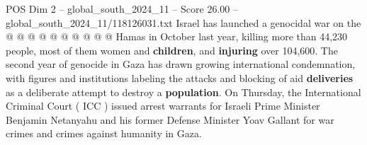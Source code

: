 \begin{textsample}{POS Dim 2 – global\_south\_2024\_11 – Score 26.00 – global\_south\_2024\_11/118126031.txt}
Israel has launched a genocidal war on the @ @ @ @ @ @ @ @ @ @ Hamas in October last year, killing more than 44,230 people, most of them women and \textbf{children}, and \textbf{injuring} over 104,600.
The second year of genocide in Gaza has drawn growing international condemnation, with figures and institutions labeling the attacks and blocking of aid \textbf{deliveries} as a deliberate attempt to destroy a \textbf{population}.
On Thursday, the International Criminal Court ( ICC ) issued arrest warrants for Israeli Prime Minister Benjamin Netanyahu and his former Defense Minister Yoav Gallant for war crimes and crimes against humanity in Gaza.

\end{textsample}
